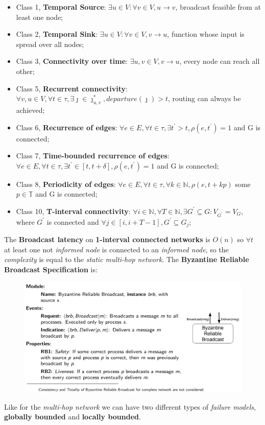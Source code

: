 \documentclass{article}
\begin{document}
\begin{itemize}
\item Class 1, \textbf{Temporal Source}: $\exists u \in V: \forall v \in V, u \rightarrow v$, broadcast feasible from at least one node;
\item Class 2, \textbf{Temporal Sink}: $\exists u \in V: \forall v \in V, v \rightarrow u$, function whose input is spread over all nodes;
\item Class 3, \textbf{Connectivity over time}: $\exists u,v \in V, v \rightarrow u$, every node can reach all other;
\item Class 5, \textbf{Recurrent connectivity}: $\forall v,u \in V, \forall t \in \tau, \exists \jmath \in \jmath_{u,v}^{*}, departure(\jmath)>t$, routing can always be achieved;
\item Class 6, \textbf{Recurrence of edges}: $\forall e \in E, \forall t \in \tau, \exists t^{'} >t, \rho(e,t^{'})=1$ and G is connected;
\item Class 7, \textbf{Time-bounded recurrence of edges}: $\forall e \in E, \forall t \in \tau, \exists t^{'} \in \left [t,t+\delta \right], \rho(e,t^{'}) = 1$ and G is connected;
\item Class 8, \textbf{Periodicity of edges}: $\forall e \in E, \forall t \in \tau, \forall k \in \mathbb{N}, \rho(e,t+kp)$ some $p \in \mathbb{T}$ and G is connected;
\item Class 10, \textbf{T-interval connectivity}: $\forall i \in \mathbb{N}, \forall T \in \mathbb{N}, \exists G^{'} \subseteq G: V_{G^{'}} =V_G$, where $G^{'}$ is connected and $\forall j \in \left [ i, i+T-1\right ], G^{'} \subseteq G_j$;
\end{itemize}
The \textbf{Broadcast latency} on\textbf{ 1-interval connected networks} is $O(n)$ so $\forall t$ at least one not \emph{informed node} is connected to an \emph{informed node}, so the \emph{complexity} is equal to the \emph{static multi-hop network}. The \textbf{Byzantine Reliable Broadcast Specification} is:
\begin{figure}[H]
  \centering
  \includegraphics[scale=0.8]{cattura99.png}
\end{figure}
Like for the \emph{multi-hop network} we can have two different types of \emph{failure models}, \textbf{globally bounded} and \textbf{locally bounded}. 
\end{document}
